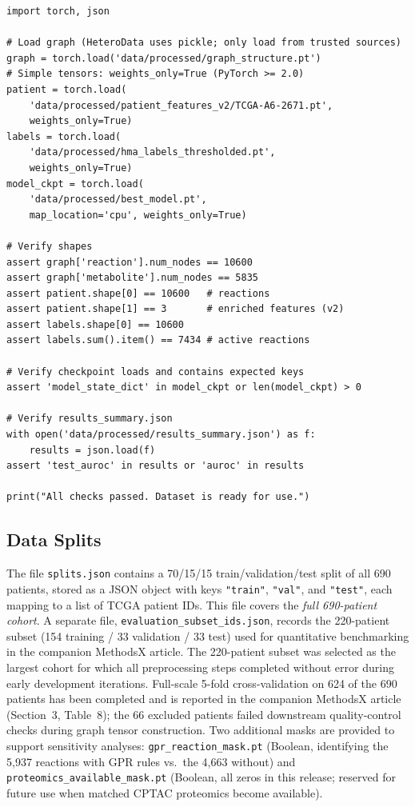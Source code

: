 \documentclass[12pt,a4paper]{article}
\begin{document}
{\small
\begin{verbatim}
import torch, json

# Load graph (HeteroData uses pickle; only load from trusted sources)
graph = torch.load('data/processed/graph_structure.pt')
# Simple tensors: weights_only=True (PyTorch >= 2.0)
patient = torch.load(
    'data/processed/patient_features_v2/TCGA-A6-2671.pt',
    weights_only=True)
labels = torch.load(
    'data/processed/hma_labels_thresholded.pt',
    weights_only=True)
model_ckpt = torch.load(
    'data/processed/best_model.pt',
    map_location='cpu', weights_only=True)

# Verify shapes
assert graph['reaction'].num_nodes == 10600
assert graph['metabolite'].num_nodes == 5835
assert patient.shape[0] == 10600   # reactions
assert patient.shape[1] == 3       # enriched features (v2)
assert labels.shape[0] == 10600
assert labels.sum().item() == 7434 # active reactions

# Verify checkpoint loads and contains expected keys
assert 'model_state_dict' in model_ckpt or len(model_ckpt) > 0

# Verify results_summary.json
with open('data/processed/results_summary.json') as f:
    results = json.load(f)
assert 'test_auroc' in results or 'auroc' in results

print("All checks passed. Dataset is ready for use.")
\end{verbatim}
}

\subsection{Data Splits}

The file \texttt{splits.json} contains a 70/15/15 train/validation/test split of all 690 patients, stored as a JSON object with keys \texttt{"train"}, \texttt{"val"}, and \texttt{"test"}, each mapping to a list of TCGA patient IDs. This file covers the \textit{full 690-patient cohort}. A separate file, \texttt{evaluation\_subset\_ids.json}, records the 220-patient subset (154 training / 33 validation / 33 test) used for quantitative benchmarking in the companion MethodsX article. The 220-patient subset was selected as the largest cohort for which all preprocessing steps completed without error during early development iterations. Full-scale 5-fold cross-validation on 624 of the 690 patients has been completed and is reported in the companion MethodsX article (Section~3, Table~8); the 66 excluded patients failed downstream quality-control checks during graph tensor construction. Two additional masks are provided to support sensitivity analyses: \texttt{gpr\_reaction\_mask.pt} (Boolean, identifying the 5,937 reactions with GPR rules vs.\ the 4,663 without) and \texttt{proteomics\_available\_mask.pt} (Boolean, all zeros in this release; reserved for future use when matched CPTAC proteomics become available).
\end{document}
